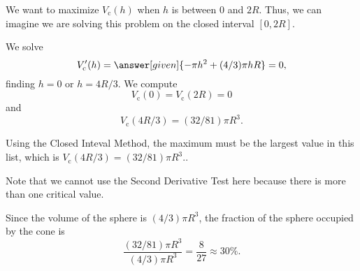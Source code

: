 \documentclass{ximera}
\begin{document}
\begin{example}
\begin{explanation}
We want to maximize $V_{\text{c}}(h)$ when $h$ is between $0$ and $2R$. Thus, we can imagine we are solving this problem on the closed interval $[0,2R]$.

We
solve 
\[
V_{\text{c}}'(h)=\answer[given]{-\pi h^2+(4/3)\pi h R}=0,
\] 
finding $h=0$ or $h=4R/3$.  We compute
\[
V_{\text{c}}(0)=V_{\text{c}}(2R)=0
\]
and
\[
V_{\text{c}}(4R/3)=(32/81)\pi R^3.
\] 

Using the Closed Inteval Method, the maximum must be the largest value in this list, which is $V_{\text{c}}(4R/3)=(32/81)\pi R^3.$.

Note that we cannot use the Second Derivative Test here because there is more than one critical value.

Since the volume of the sphere is $(4/3)\pi
R^3$, the fraction of the sphere occupied by the cone is
\[
\frac{(32/81)\pi R^3}{(4/3)\pi R^3}=\frac{8}{27}\approx 30\%.
\]
\end{explanation}
\end{example}
\end{document}
